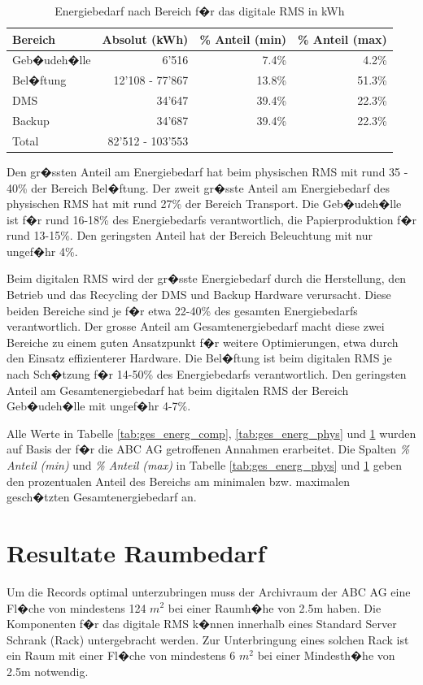 \documentclass[a4paper,twoside,10pt]{report}
\begin{document}
\begin{table} [h]
	\begin{tabular}{l|r|r|r}
	\hline
	\textbf{Bereich} & \textbf{Absolut (kWh)} & \textbf{\% Anteil (min)}& \textbf{\% Anteil (max)}\\
	\hline
	Geb�udeh�lle 		&	6'516 					& 7.4\% & 4.2\% \\
	Bel�ftung				&	12'108 - 77'867	& 13.8\%	&	51.3\% \\
	DMS 				 		& 34'647 					& 39.4\%&	22.3\% \\				
	Backup					& 34'687					&	39.4\%&	22.3\% \\
	\hline
	\hline
	Total  & 82'512 - 103'553  \\
	\hline
	\end{tabular}
\caption{Energiebedarf nach Bereich f�r das digitale RMS in kWh} 
\label{tab:ges_energ_digi}
\end{table}

Den gr�ssten Anteil am Energiebedarf hat beim physischen \ac{RMS} mit rund 35 - 40\% der Bereich Bel�ftung. Der zweit gr�sste Anteil am Energiebedarf des physischen \ac{RMS} hat mit rund 27\% der Bereich Transport. Die Geb�udeh�lle ist f�r rund 16-18\% des Energiebedarfs verantwortlich, die Papierproduktion f�r rund 13-15\%. Den geringsten Anteil hat der Bereich Beleuchtung mit nur ungef�hr 4\%.

Beim digitalen \ac{RMS} wird der gr�sste Energiebedarf durch die Herstellung, den Betrieb und das Recycling der DMS und Backup Hardware verursacht. Diese beiden Bereiche sind je f�r etwa 22-40\% des gesamten Energiebedarfs verantwortlich. Der grosse Anteil am Gesamtenergiebedarf macht diese zwei Bereiche zu einem guten Ansatzpunkt f�r weitere Optimierungen, etwa durch den Einsatz effizienterer Hardware. Die Bel�ftung ist beim digitalen \ac{RMS} je nach Sch�tzung f�r 14-50\% des Energiebedarfs verantwortlich. Den geringsten Anteil am Gesamtenergiebedarf hat beim digitalen \ac{RMS} der Bereich Geb�udeh�lle mit ungef�hr 4-7\%.

Alle Werte in Tabelle \ref{tab:ges_energ_comp}, \ref{tab:ges_energ_phys} und \ref{tab:ges_energ_digi} wurden auf Basis der f�r die ABC AG getroffenen Annahmen erarbeitet. Die Spalten \emph{\% Anteil (min)} und \emph{\% Anteil (max)} in Tabelle \ref{tab:ges_energ_phys} und \ref{tab:ges_energ_digi} geben den prozentualen Anteil des Bereichs am minimalen bzw. maximalen gesch�tzten Gesamtenergiebedarf an.

\section{Resultate Raumbedarf}
Um die Records optimal unterzubringen muss der Archivraum der ABC AG eine Fl�che von mindestens 124 $m^2$ bei einer Raumh�he von 2.5m haben. Die Komponenten f�r das digitale \ac{RMS} k�nnen innerhalb eines Standard Server Schrank (Rack) untergebracht werden. Zur Unterbringung eines solchen Rack ist ein Raum mit einer Fl�che von mindestens 6 $m^2$ bei einer Mindesth�he von 2.5m notwendig. 
\end{document}
